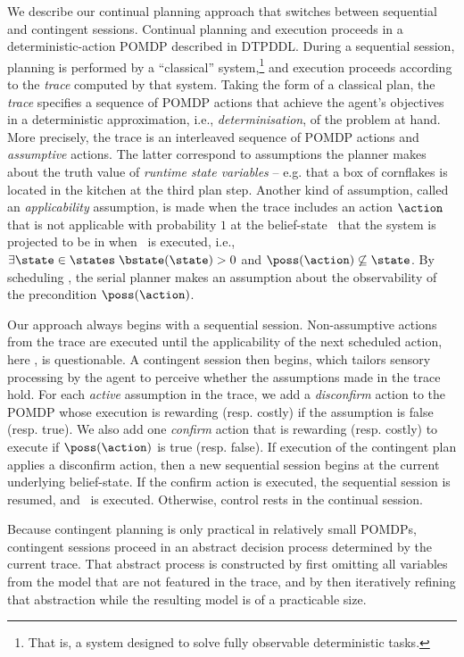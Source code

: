 

We describe our continual planning approach that switches between
sequential and contingent sessions. Continual planning and execution
proceeds in a deterministic-action POMDP described in DTPDDL. During a
sequential session, planning is performed by a ``classical''
system,\footnote{That is, a system designed to solve fully observable
deterministic tasks.}  and execution proceeds according to the {\em
trace} computed by that system. Taking the form of a classical plan,
the {\em trace} specifies a sequence of POMDP actions that achieve the
agent's objectives in a deterministic approximation, i.e., {\em
determinisation}, of the problem at hand. More precisely, the trace is
an interleaved sequence of POMDP actions and {\em assumptive}
actions. The latter correspond to assumptions the planner makes about
the truth value of {\em runtime state variables} -- e.g. that a box of
cornflakes is located in the kitchen at the third plan step. Another
kind of assumption, called an {\em applicability} assumption, is made
when the trace includes an action $\action$ that is not applicable
with probability $1$ at the belief-state
\bstate\ that the system is projected to be in when \action\ is executed, 
i.e., $\exists\state\in\states\;
\bstate(\state) > 0$ and $\poss(\action)\not\subseteq\state$. By
scheduling
\action,  the serial planner makes an assumption about the
observability of the precondition $\poss(\action)$.

Our approach always begins with a sequential session. Non-assumptive
actions from the trace are executed until the applicability of the
next scheduled action, here \action, is questionable. A contingent
session then begins, which tailors sensory processing by the agent to
perceive whether the assumptions made in the trace hold. For each {\em
active} assumption in the trace, we add a {\em disconfirm} action to
the POMDP whose execution is rewarding (resp. costly) if the
assumption is false (resp. true). We also add one {\em confirm} action
that is rewarding (resp. costly) to execute if $\poss(\action)$ is
true (resp. false). If execution of the contingent plan applies a
disconfirm action, then a new sequential session begins at the current
underlying belief-state. If the confirm action is executed, the
sequential session is resumed, and \action\ is executed. Otherwise,
control rests in the continual session.



Because contingent planning is only practical in relatively small
POMDPs, contingent sessions proceed in an abstract decision process
determined by the current trace. That abstract process is constructed
by first omitting all variables from the model that are not featured
in the trace, and by then iteratively refining that abstraction while
the resulting model is of a practicable size.



